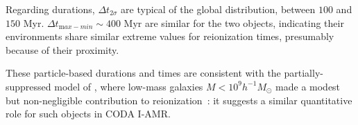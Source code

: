 \documentclass[twocolumn]{aastex61}
\begin{document}
Regarding durations, $\Delta t_{2\sigma}$ are typical of the global distribution, between $100$ and $150$ Myr. $\Delta t_{\mathrm max-min} \sim 400$ Myr are similar for the two objects, indicating their environments share similar extreme values for reionization times, presumably because of their proximity. %

These particle-based durations and times are consistent with the partially-suppressed model of \citet{DIX17}, where low-mass galaxies $M<10^9 h^{-1} M_\odot$ made a modest but 
non-negligible contribution to reionization~: it suggests a similar quantitative role for such objects in CODA I-AMR.
\end{document}
